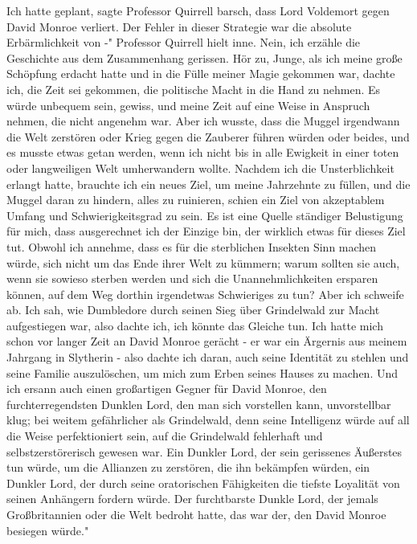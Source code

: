 \glqq Ich hatte geplant\grqq{}, sagte Professor Quirrell barsch, \glqq dass Lord
Voldemort gegen David Monroe verliert. Der Fehler in dieser Strategie war die
absolute Erbärmlichkeit von -" Professor Quirrell hielt inne. \glqq Nein, ich
erzähle die Geschichte aus dem Zusammenhang gerissen. Hör zu, Junge, als ich
meine große Schöpfung erdacht hatte und in die Fülle meiner Magie gekommen war,
dachte ich, die Zeit sei gekommen, die politische Macht in die Hand zu nehmen.
Es würde unbequem sein, gewiss, und meine Zeit auf eine Weise in Anspruch
nehmen, die nicht angenehm war. Aber ich wusste, dass die Muggel irgendwann die
Welt zerstören oder Krieg gegen die Zauberer führen würden oder beides, und es
musste etwas getan werden, wenn ich nicht bis in alle Ewigkeit in einer toten
oder langweiligen Welt umherwandern wollte. Nachdem ich die Unsterblichkeit
erlangt hatte, brauchte ich ein neues Ziel, um meine Jahrzehnte zu füllen, und
die Muggel daran zu hindern, alles zu ruinieren, schien ein Ziel von akzeptablem
Umfang und Schwierigkeitsgrad zu sein. Es ist eine Quelle ständiger Belustigung
für mich, dass ausgerechnet ich der Einzige bin, der wirklich etwas für dieses
Ziel tut. Obwohl ich annehme, dass es für die sterblichen Insekten Sinn machen
würde, sich nicht um das Ende ihrer Welt zu kümmern; warum sollten sie auch,
wenn sie sowieso sterben werden und sich die Unannehmlichkeiten ersparen können,
auf dem Weg dorthin irgendetwas Schwieriges zu tun? Aber ich schweife ab. Ich
sah, wie Dumbledore durch seinen Sieg über Grindelwald zur Macht aufgestiegen
war, also dachte ich, ich könnte das Gleiche tun. Ich hatte mich schon vor
langer Zeit an David Monroe gerächt - er war ein Ärgernis aus meinem Jahrgang in
Slytherin - also dachte ich daran, auch seine Identität zu stehlen und seine
Familie auszulöschen, um mich zum Erben seines Hauses zu machen. Und ich ersann
auch einen großartigen Gegner für David Monroe, den furchterregendsten Dunklen
Lord, den man sich vorstellen kann, unvorstellbar klug; bei weitem gefährlicher
als Grindelwald, denn seine Intelligenz würde auf all die Weise perfektioniert
sein, auf die Grindelwald fehlerhaft und selbstzerstörerisch gewesen war. Ein
Dunkler Lord, der sein gerissenes Äußerstes tun würde, um die Allianzen zu
zerstören, die ihn bekämpfen würden, ein Dunkler Lord, der durch seine
oratorischen Fähigkeiten die tiefste Loyalität von seinen Anhängern fordern
würde. Der furchtbarste Dunkle Lord, der jemals Großbritannien oder die Welt
bedroht hatte, das war der, den David Monroe besiegen würde."

